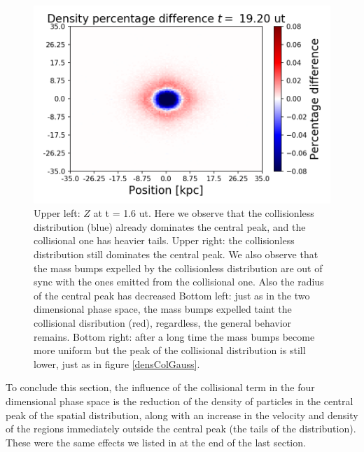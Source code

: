 {\begin{figure}[h!]
    \includegraphics[scale=0.45]{imag/c2dDens48.png}
    \caption{Upper left: $Z$ at t = 1.6 ut. Here we observe that the collisionless distribution (blue) already dominates the central peak, and the collisional one has heavier tails. Upper right: the collisionless distribution still dominates the central peak. We also observe that the mass bumps expelled by the collisionless distribution are out of sync with the ones emitted from the collisional one. Also the radius of the central peak has decreased  Bottom left: just as in the two dimensional phase space, the mass bumps expelled taint the collisional disribution (red), regardless, the general behavior remains. Bottom right: after a long time the mass bumps become more uniform but the peak of the collisional distribution is still lower, just as in figure \ref{densColGauss}. }
    \label{2dDensCol}
\end{figure}

To conclude this section, the influence of the collisional term in the four dimensional phase space is the reduction of the density of particles in the central peak of the spatial distribution, along with an increase in the velocity and density of the regions immediately outside the central peak (the tails of the distribution). 
These were the same effects we listed in at the end of the last section.

\newpage
}
